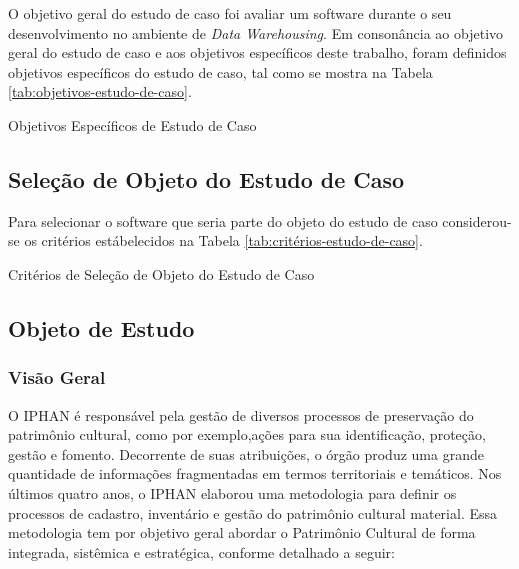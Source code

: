 O objetivo geral do estudo de caso foi avaliar um software durante o seu desenvolvimento no ambiente de \textit{Data Warehousing}. Em consonância ao objetivo geral do estudo de caso e aos objetivos específicos deste trabalho, foram definidos objetivos específicos do estudo de caso, tal como se mostra na Tabela \ref{tab:objetivos-estudo-de-caso}.

\begin{table}[H]
\begin{center}

\caption{Objetivos Específicos de Estudo de Caso}
\label{tab:objetivos-estudo-de-caso}
\end{center}
\end{table}
\FloatBarrier

\subsection{Seleção de Objeto do Estudo de Caso} 

Para selecionar o software que seria parte do objeto do estudo de caso considerou-se os 
critérios estábelecidos na Tabela \ref{tab:critérios-estudo-de-caso}. 


\begin{table}[H]
\begin{center}

\caption{Critérios de Seleção de Objeto do Estudo de Caso}
\label{tab:critérios-estudo-de-caso}
\end{center}
\end{table}
\FloatBarrier

\subsection{Objeto de Estudo}

\subsubsection{Visão Geral}

O IPHAN é responsável pela gestão de diversos processos de preservação do patrimônio cultural, como por exemplo,ações para sua identificação, proteção, gestão e fomento. Decorrente
de suas atribuições, o órgão produz uma grande quantidade de informações fragmentadas em termos territoriais e temáticos. Nos últimos quatro anos, o IPHAN elaborou uma metodologia
para definir os processos de cadastro, inventário e gestão do patrimônio cultural material. Essa metodologia tem por objetivo geral abordar o Patrimônio Cultural de forma integrada, sistêmica
e estratégica, conforme detalhado a seguir:

